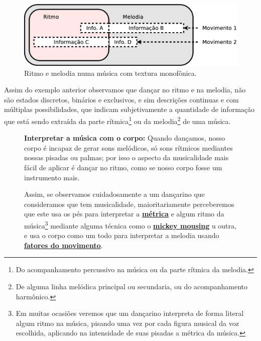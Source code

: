 \begin{figure}[!h]
\centering
      \includegraphics[width=.75\linewidth]{chapters/cap-musicalidade-tecnica/ritmo-melodia-1}  
      \caption{Ritmo e melodia numa música com textura monofônica.}
      \label{fig:ritmo-melodia-1}
\end{figure}
Assim do exemplo anterior observamos que dançar no ritmo e na melodia, não são estados discretos, binários e exclusivos,
e sim descrições continuas e com múltiplas possibilidades, 
que indicam subjetivamente a quantidade de informação que está sendo extraída da parte rítmica\footnote{Do 
acompanhamento percussivo na música ou da parte rítmica da melodia.}
ou da melodia\footnote{De alguma linha melódica principal ou secundaria, ou do acompanhamento harmônico.}
de uma música.

\begin{figure}[!t]
\begin{tcbinformation} 
\textbf{Interpretar a música com o corpo:}
Quando dançamos, nosso corpo é incapaz de gerar sons melódicos, só sons rítmicos
mediantes nossas pisadas ou palmas;
por isso o aspecto da musicalidade mais fácil de aplicar é dançar no ritmo,
como se nosso corpo fosse um instrumento mais.

Assim, se observamos cuidadosamente a um dançarino que consideramos que tem musicalidade,
maioritariamente perceberemos que este usa os pés para interpretar a 
\hyperref[def:Metrica]{\textbf{métrica}} e algum ritmo da música\footnote{Em muitas ocasiões 
veremos que um dançarino interpreta de forma literal algum ritmo na música,
pisando uma vez por cada figura musical da voz escolhida, 
aplicando na intensidade de suas pisadas a métrica da música.} mediante alguma técnica como o 
\hyperref[sec:mikeymousing]{\textbf{mickey mousing}} u outra,
e usa o corpo como um todo para interpretar a melodia usando 
\hyperref[subsec:fatordinamica]{\textbf{fatores do movimento}}.
\end{tcbinformation} 
\end{figure}

